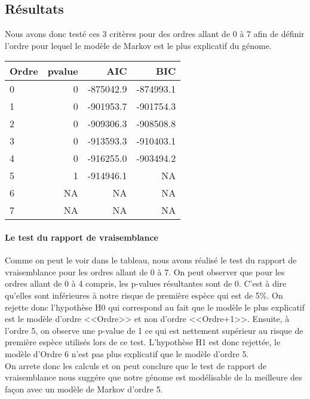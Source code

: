 \documentclass[12pt,a4paper]{article}
\begin{document}
\subsection{Résultats}
Nous avons donc testé ces 3 critères pour des ordres allant de 0 à 7 afin de définir l'ordre pour lequel le modèle de Markov est le plus explicatif du génome.
\begin{table}[!h]
\centering
\begin{tabular}{l|r|r|r}
\hline
Ordre & pvalue & AIC & BIC\\
\hline
0 & 0 & -875042.9 & -874993.1\\
\hline
1 & 0 & -901953.7 & -901754.3\\
\hline
2 & 0 & -909306.3 & -908508.8\\
\hline
3 & 0 & -913593.3 & -910403.1\\
\hline
4 & 0 & -916255.0 & -903494.2\\
\hline
5 & 1 & -914946.1 & NA\\
\hline
6 & NA & NA & NA\\
\hline
7 & NA & NA & NA\\
\hline
\end{tabular}
\end{table}
\paragraph{Le test du rapport de vraisemblance}
Comme on peut le voir dans le tableau, nous avons réalisé le test du rapport de vraisemblance pour les ordres allant de 0 à 7.
On peut observer que pour les ordres allant de 0 à 4 compris, les p-values résultantes sont de 0. C'est à dire qu'elles sont inférieures à notre risque de première espèce qui est de 5\%. On rejette donc l'hypothèse H0 qui correspond au fait que le modèle le plus explicatif est le modèle d'ordre <<Ordre>> et non d'ordre <<Ordre+1>>. Ensuite, à l'ordre 5, on observe une p-value de 1 ce qui est nettement supérieur au risque de première espèce utilisés lors de ce test. L'hypothèse H1 est donc rejettée, le modèle d'Ordre 6 n'est pas plus explicatif que le modèle d'ordre 5.
\\ \indent
On arrete donc les calculs et on peut conclure que le test de rapport de vraisemblance nous suggére que notre génome est modélisable de la meilleure des façon avec un modèle de Markov d'ordre 5.
\end{document}
